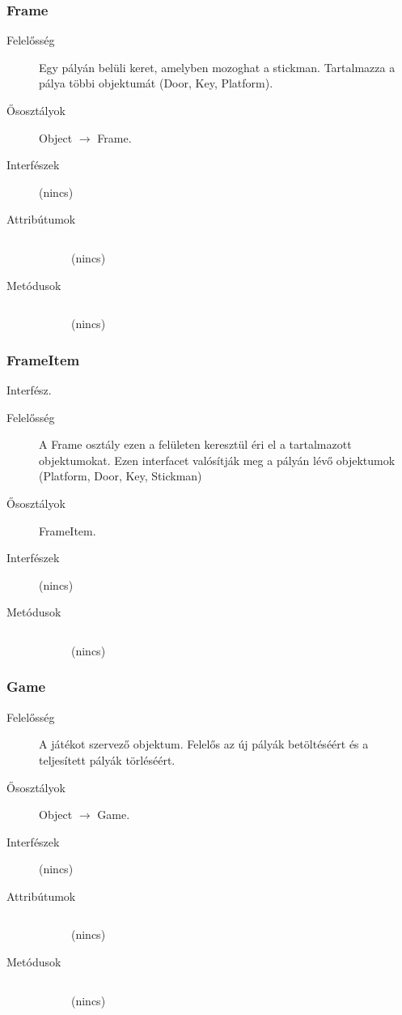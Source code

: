 		\subsubsection{Frame}
		\begin{description}
		\item[Felelősség]
		Egy pályán belüli keret, amelyben mozoghat a stickman. Tartalmazza a pálya többi objektumát (Door, Key, Platform).
		\item[Ősosztályok] Object $\rightarrow{}$ Frame.
		\item[Interfészek] (nincs)
		\item[Attribútumok]$\ $
		\begin{description}
		\item[] (nincs)
		\end{description}
		\item[Metódusok]$\ $
		\begin{description}
		\item[] (nincs)
		\end{description}
		\end{description}
		
		\subsubsection{FrameItem}
		Interfész.
		\begin{description}
		\item[Felelősség]
		A Frame osztály ezen a felületen keresztül éri el a tartalmazott objektumokat.   Ezen interfacet valósítják meg a pályán lévő objektumok (Platform, Door, Key, Stickman)
		\item[Ősosztályok] FrameItem.
		\item[Interfészek] (nincs)
		\item[Metódusok]$\ $
		\begin{description}
		\item[] (nincs)
		\end{description}
		\end{description}
		
		\subsubsection{Game}
		\begin{description}
		\item[Felelősség]
		A játékot szervező objektum. Felelős az új pályák betöltéséért és a teljesített pályák törléséért.
		\item[Ősosztályok] Object $\rightarrow{}$ Game.
		\item[Interfészek] (nincs)
		\item[Attribútumok]$\ $
		\begin{description}
		\item[] (nincs)
		\end{description}
		\item[Metódusok]$\ $
		\begin{description}
		\item[] (nincs)
		\end{description}
		\end{description}
		
